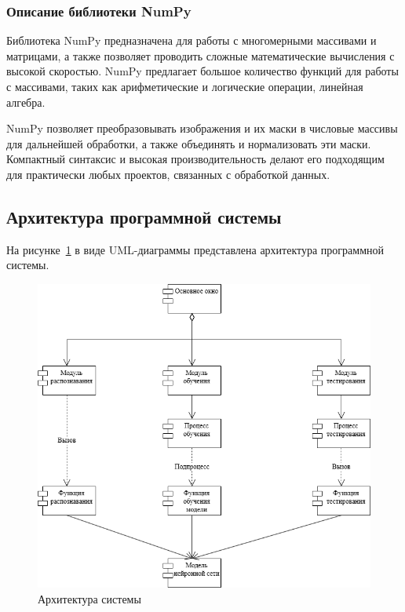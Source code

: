 \subsubsection{Описание библиотеки NumPy}

Библиотека NumPy предназначена для работы с многомерными массивами и матрицами, а также позволяет проводить сложные математические вычисления с высокой скоростью. NumPy предлагает большое количество функций для работы с массивами, таких как арифметические и логические операции, линейная алгебра. 

NumPy позволяет преобразовывать изображения и их маски в числовые массивы для дальнейшей обработки, а также объединять и нормализовать эти маски. Компактный синтаксис и высокая производительность делают его подходящим для практически любых проектов, связанных с обработкой данных. 

\subsection{Архитектура программной системы}

На рисунке~\ref{fig:structure} в виде UML-диаграммы представлена архитектура программной системы.  

\begin{figure}[h]
	\centering
	\includegraphics[width=0.85\linewidth]{images/компоненты}
	\caption{Архитектура системы}
	\label{fig:structure}
\end{figure}

